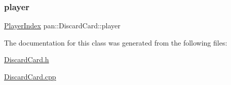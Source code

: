 \subsubsection{\texorpdfstring{player}{player}}
{\footnotesize\ttfamily \hyperlink{namespacepan_a0cdabf874fbf1bb3a1f0152d108c2909}{Player\+Index} pan\+::\+Discard\+Card\+::player}



The documentation for this class was generated from the following files\+:\begin{DoxyCompactItemize}
\item 
\hyperlink{_discard_card_8h}{Discard\+Card.\+h}\item 
\hyperlink{_discard_card_8cpp}{Discard\+Card.\+cpp}\end{DoxyCompactItemize}
